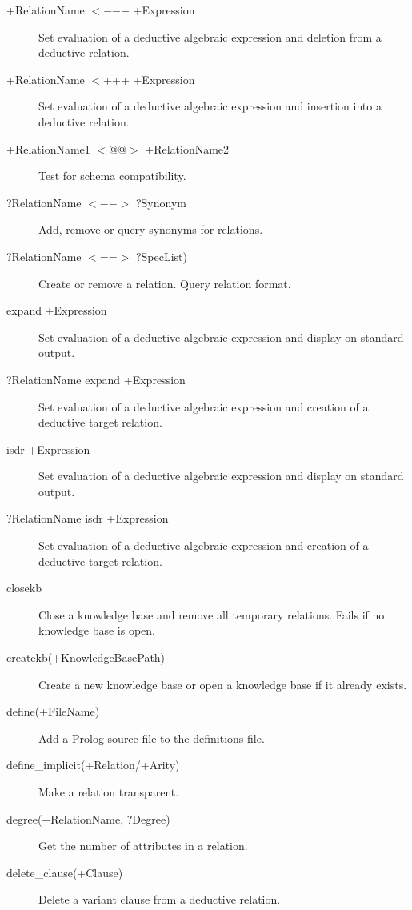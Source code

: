 \begin{description}
\item[+RelationName \hspace {1mm} $<$$-$$-$$-$ \hspace {1mm} +Expression]{Set evaluation of a deductive algebraic expression and deletion from a deductive relation.}
\item[+RelationName \hspace {1mm} $<$+++ \hspace {1mm} +Expression]{Set evaluation of a deductive algebraic expression and insertion into a deductive relation.}
\item[+RelationName1 \hspace {1mm} $<$@@$>$ \hspace {1mm} +RelationName2]{Test for schema compatibility.}
\item[?RelationName \hspace {1mm} $<$$-$$-$$>$ \hspace {1mm} ?Synonym]{Add, remove or query synonyms for relations.}
\item[?RelationName \hspace {1mm} $<$==$>$ \hspace {1mm} ?SpecList)]{Create or remove a relation. Query relation format.}
\item[expand +Expression]{Set evaluation of a deductive algebraic expression and display on standard output.}
\item[?RelationName expand +Expression]{Set evaluation of a deductive algebraic expression and creation of a deductive target relation.}
\item[isdr +Expression]{Set evaluation of a deductive algebraic expression and display on standard output.}
\item[?RelationName isdr +Expression]{Set evaluation of a deductive algebraic expression and creation of a deductive target relation.}
\item[closekb]{Close a knowledge base and remove all temporary relations. Fails if no knowledge base is open.}
\item[createkb(+KnowledgeBasePath)]{Create a new knowledge base or open a knowledge base if it already exists.}
\item[define(+FileName)]{Add a Prolog source file to the definitions file.}
\item[define_implicit(+Relation/+Arity)]{Make a relation transparent.}
\item[degree(+RelationName, ?Degree)]{Get the number of attributes in a relation.}
\item[delete_clause(+Clause)]{Delete a variant clause from a deductive relation.}

\end{description}
